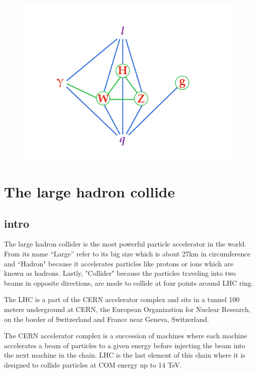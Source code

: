 \begin{figure}[t!]
\centering
\includegraphics[width=0.99\textwidth]{figures/SM_coupling.png}
\caption[interactions between fundamental particles]{
\label{fig:SMcoupling}}
\end{figure}
\section{The large hadron collide}
\subsection{intro}
The large hadron collider is the most powerful particle accelerator in the world. From its name “Large” refer to its big size which is about 27km in circumference and “Hadron" because it accelerates particles like protons or ions which are known as hadrons. Lastly, "Collider" because the particles traveling into two beams in opposite directions, are made to collide at four points around LHC ring.  

The LHC is a part of the CERN accelerator complex and sits in a tunnel 100 meters underground at CERN, the European Organization for Nuclear Research, on the border of Switzerland and France near Geneva, Switzerland.   

The CERN accelerator complex is a succession of machines where each machine accelerates a beam of particles to a given energy before injecting the beam into the next machine in the chain. LHC is the last element of this chain where it is designed to collide particles at COM energy up to 14 TeV.

